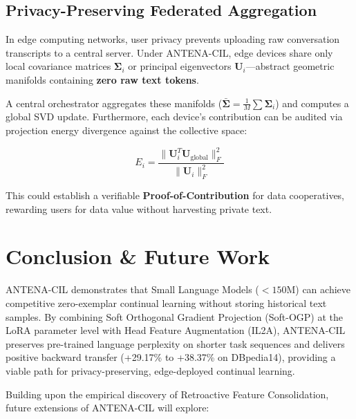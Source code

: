 \documentclass[11pt,a4paper]{article}
\begin{document}
\subsection{Privacy-Preserving Federated Aggregation}

In edge computing networks, user privacy prevents uploading raw conversation transcripts to a central server. Under ANTENA-CIL, edge devices share only local covariance matrices $\boldsymbol{\Sigma}_i$ or principal eigenvectors $\mathbf{U}_i$---abstract geometric manifolds containing \textbf{zero raw text tokens}.

A central orchestrator aggregates these manifolds ($\bar{\boldsymbol{\Sigma}} = \frac{1}{M}\sum \boldsymbol{\Sigma}_i$) and computes a global SVD update. Furthermore, each device's contribution can be audited via projection energy divergence against the collective space:

\begin{equation}
E_i = \frac{\|\mathbf{U}_i^T \mathbf{U}_{\text{global}}\|_F^2}{\|\mathbf{U}_i\|_F^2}
\end{equation}

This could establish a verifiable \textbf{Proof-of-Contribution} for data cooperatives, rewarding users for data value without harvesting private text.

\section{Conclusion \& Future Work}

ANTENA-CIL demonstrates that Small Language Models (${<}150$M) can achieve competitive zero-exemplar continual learning without storing historical text samples. By combining Soft Orthogonal Gradient Projection (Soft-OGP) at the LoRA parameter level with Head Feature Augmentation (IL2A), ANTENA-CIL preserves pre-trained language perplexity on shorter task sequences and delivers positive backward transfer (+29.17\% to +38.37\% on DBpedia14), providing a viable path for privacy-preserving, edge-deployed continual learning.

Building upon the empirical discovery of Retroactive Feature Consolidation, future extensions of ANTENA-CIL will explore:
\end{document}
